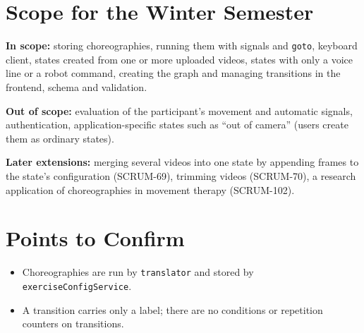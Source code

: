 \documentclass[12pt,a4paper]{article}
\begin{document}

\section{Scope for the Winter Semester}

\textbf{In scope:} storing choreographies, running them with signals and
\texttt{goto}, keyboard client, states created from one or more uploaded
videos, states with only a voice line or a robot command, creating the graph
and managing transitions in the frontend, schema and validation.

\textbf{Out of scope:} evaluation of the participant's movement and
automatic signals, authentication, application-specific states such as
``out of camera'' (users create them as ordinary states).

\textbf{Later extensions:} merging several videos into one state by
appending frames to the state's configuration (SCRUM-69), trimming videos
(SCRUM-70), a research application of choreographies in movement therapy
(SCRUM-102).


\section{Points to Confirm}

\begin{itemize}
    \item Choreographies are run by \texttt{translator} and stored by
          \texttt{exerciseConfigService}.
    \item A transition carries only a label; there are no conditions or
          repetition counters on transitions.
\end{itemize}
\end{document}
